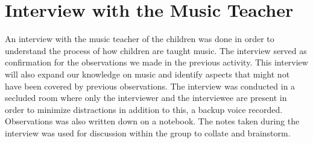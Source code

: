
\section{Interview with the Music Teacher}
An interview with the music teacher of the children was done in order to understand the process of how children are taught music. The interview served as confirmation for the observations we made in the previous activity. This interview will also expand our knowledge on music and identify aspects that might not have been covered by previous observations. The interview was conducted in a secluded room where only the interviewer and the interviewee are present in order to minimize distractions in addition to this, a backup voice recorded. Observations was also written down on a notebook. The notes taken during the interview was used for discussion within the group to collate and brainstorm.

